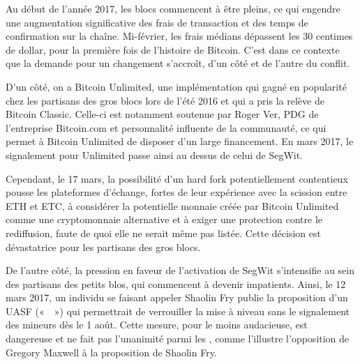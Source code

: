Au début de l'année 2017, les blocs commencent à être pleins, ce qui engendre une augmentation significative des frais de transaction et des temps de confirmation sur la chaîne. Mi-février, les frais médians dépassent les 30 centimes de dollar, pour la première fois de l'histoire de Bitcoin. C'est dans ce contexte que la demande pour un changement s'accroît, d'un côté et de l'autre du conflit.

D'un côté, on a Bitcoin Unlimited, une implémentation qui gagné en popularité chez les partisans des gros blocs lors de l'été 2016 et qui a pris la relève de Bitcoin Classic. Celle-ci est notamment soutenue par Roger Ver, PDG de l'entreprise Bitcoin.com et personnalité influente de la communauté, ce qui permet à Bitcoin Unlimited de disposer d'un large financement. En mars 2017, le signalement pour Unlimited passe ainsi au dessus de celui de SegWit. 

Cependant, le 17 mars, la possibilité d'un hard fork potentiellement contentieux pousse les plateformes d'échange, fortes de leur expérience avec la scission entre ETH et ETC, à considérer la potentielle monnaie créée par Bitcoin Unlimited comme une cryptomonnaie alternative et à exiger une protection contre le rediffusion, faute de quoi elle ne serait même pas listée. Cette décision est dévastatrice pour les partisans des gros blocs.

De l'autre côté, la pression en faveur de l'activation de SegWit s'intensifie au sein des partisans des petits blos, qui commencent à devenir impatients. Ainsi, le 12 mars 2017, un individu se faisant appeler Shaolin Fry publie la proposition d'un UASF («~~») qui permettrait de verrouiller la mise à niveau sans le signalement des mineurs dès le 1\ier{} août. Cette mesure, pour le moins audacieuse, est dangereuse et ne fait pas l'unanimité parmi les , comme l'illustre l'opposition de Gregory Maxwell à la proposition de Shaolin Fry.

